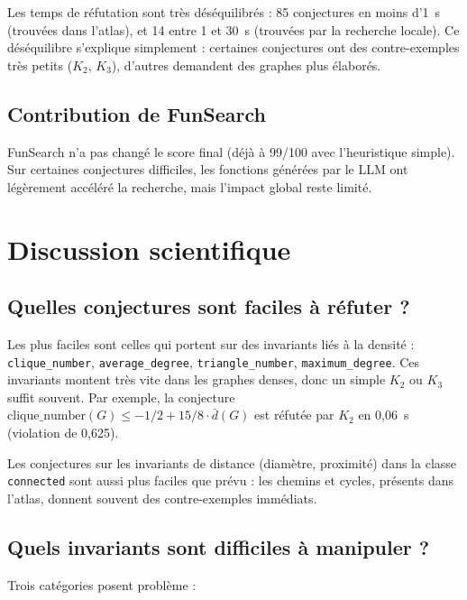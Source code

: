 \documentclass[12pt,a4paper]{article}
\begin{document}
Les temps de réfutation sont très déséquilibrés : 85 conjectures en moins d'1~s
(trouvées dans l'atlas), et 14 entre 1 et 30~s (trouvées par la recherche locale).
Ce déséquilibre s'explique simplement : certaines conjectures ont des contre-exemples
très petits ($K_2$, $K_3$), d'autres demandent des graphes plus élaborés.

\subsection{Contribution de FunSearch}

FunSearch n'a pas changé le score final (déjà à 99/100 avec l'heuristique simple).
Sur certaines conjectures difficiles, les fonctions générées par le LLM ont
légèrement accéléré la recherche, mais l'impact global reste limité.

\section{Discussion scientifique}

\subsection{Quelles conjectures sont faciles à réfuter ?}

Les plus faciles sont celles qui portent sur des invariants liés à la densité :
\texttt{clique\_number}, \texttt{average\_degree}, \texttt{triangle\_number},
\texttt{maximum\_degree}.  Ces invariants montent très vite dans les graphes
denses, donc un simple $K_2$ ou $K_3$ suffit souvent.  Par exemple, la conjecture
$\mathrm{clique\_number}(G) \leq -1/2 + 15/8 \cdot \bar{d}(G)$ est réfutée
par $K_2$ en 0,06~s (violation de 0,625).

Les conjectures sur les invariants de distance (diamètre, proximité) dans la
classe \texttt{connected} sont aussi plus faciles que prévu : les chemins et
cycles, présents dans l'atlas, donnent souvent des contre-exemples immédiats.

\subsection{Quels invariants sont difficiles à manipuler ?}

Trois catégories posent problème :
\end{document}
